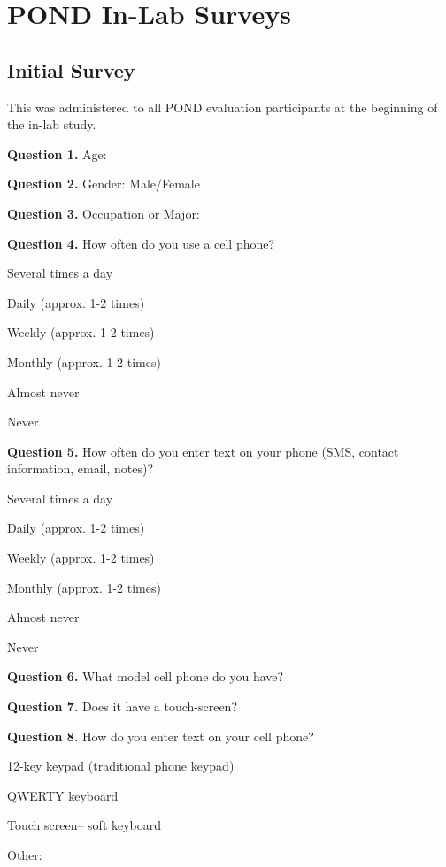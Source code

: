 \chapter{POND In-Lab Surveys}
\label{cha:app_POND_inlab_surveys}

\section{Initial Survey}
This was administered to all POND evaluation participants at the beginning of the in-lab study. 

\noindent\textbf{Question 1.}
Age: 


\noindent\textbf{Question 2.}
Gender: Male/Female

\noindent\textbf{Question 3.}
Occupation or Major: 

\noindent\textbf{Question 4.}
How often do you use a cell phone?
\begin{itemize*}
\item	Several times a day
\item	Daily (approx. 1-2 times)
\item	Weekly (approx. 1-2 times)
\item	Monthly (approx. 1-2 times)
\item	Almost never
\item	Never
\end{itemize*}

\noindent\textbf{Question 5.}
How often do you enter text on your phone (SMS, contact information, email, notes)?
\begin{itemize*}
\item	Several times a day
\item		Daily (approx. 1-2 times)
\item		Weekly (approx. 1-2 times)
\item		Monthly (approx. 1-2 times)
\item		Almost never
\item		Never
\end{itemize*}

\noindent\textbf{Question 6.}
What model cell phone do you have? 

\noindent\textbf{Question 7.}
Does it have a touch-screen?


\noindent\textbf{Question 8.}
How do you enter text on your cell phone?

\begin{itemize*}
\item	12-key keypad (traditional phone keypad)
\item	QWERTY keyboard
\item	Touch screen-- soft keyboard
\item	Other:  
\end{itemize*}

